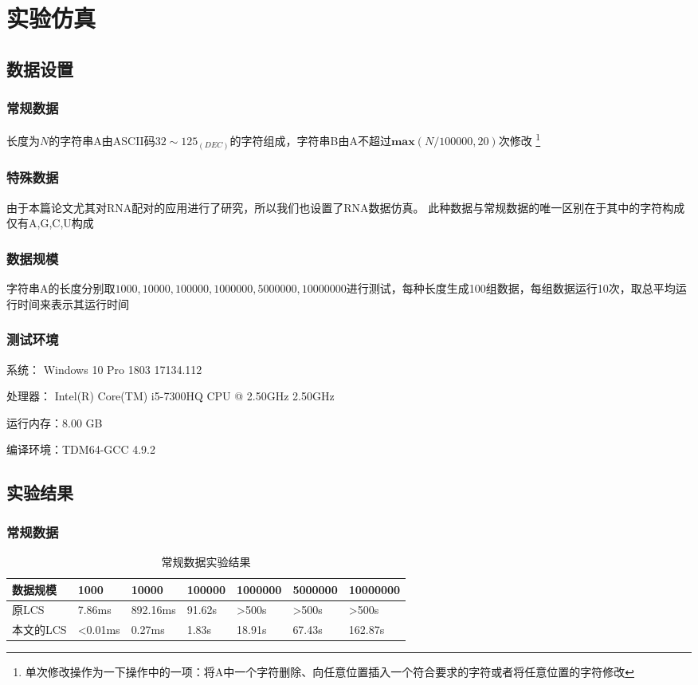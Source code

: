\chapter{实验仿真}
\section{数据设置}
\subsection{常规数据}
长度为$N$的字符串A由ASCII码$32\sim 125_{(DEC)}$的字符组成，字符串B由A不超过$\textbf{max}(N/100000,20)$次修改
\footnote[1]{单次修改操作为一下操作中的一项：将A中一个字符删除、向任意位置插入一个符合要求的字符或者将任意位置的字符修改}
\subsection{特殊数据}
由于本篇论文尤其对RNA配对的应用进行了研究，所以我们也设置了RNA数据仿真。
此种数据与常规数据的唯一区别在于其中的字符构成仅有A,G,C,U构成
\subsection{数据规模}
字符串A的长度分别取$1000,10000,100000,1000000,5000000,10000000$进行测试，每种长度生成100组数据，每组数据运行10次，取总平均运行时间来表示其运行时间
\subsection{测试环境}
系统：    Windows 10 Pro 1803 17134.112 \par
处理器：  Intel(R) Core(TM) i5-7300HQ CPU @ 2.50GHz 2.50GHz \par
运行内存：8.00 GB \par
编译环境：TDM64-GCC 4.9.2
\section{实验结果}
\subsection{常规数据}
\begin{table}[H]
  \caption{常规数据实验结果}
  \centering
  \begin{tabular}{p{2.6cm}<{\centering}p{1.9cm}<{\centering}p{1.9cm}<{\centering}p{1.9cm}<{\centering}p{1.9cm}<{\centering}p{1.9cm}<{\centering}p{1.9cm}<{\centering}}
  \toprule
   数据规模 & 1000 & 10000 & 100000 & 1000000 & 5000000 & 10000000\\
  \midrule
   原LCS & 7.86ms & 892.16ms & 91.62s & >500s & >500s & >500s\\
   本文的LCS & <0.01ms & 0.27ms & 1.83s & 18.91s & 67.43s & 162.87s\\
  \bottomrule
  \end{tabular}
\end{table}
  
